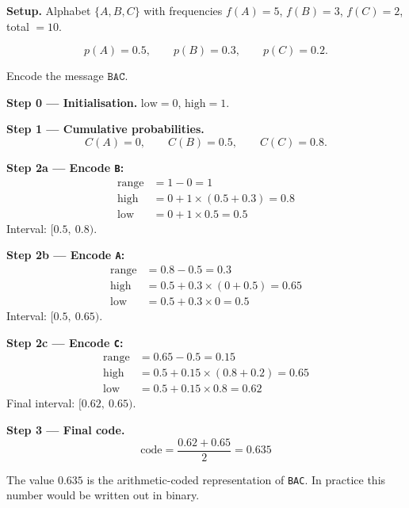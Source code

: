 \begin{examplebox}
\textbf{Setup.} Alphabet $\{A, B, C\}$ with frequencies $f(A)=5$,
$f(B)=3$, $f(C)=2$, total $= 10$.

\[
  p(A) = 0.5, \qquad p(B) = 0.3, \qquad p(C) = 0.2.
\]

Encode the message $\texttt{BAC}$.

\medskip
\textbf{Step 0 — Initialisation.}
$\mathrm{low} = 0$, $\mathrm{high} = 1$.

\medskip
\textbf{Step 1 — Cumulative probabilities.}
\[
  C(A) = 0, \qquad C(B) = 0.5, \qquad C(C) = 0.8.
\]

\medskip
\textbf{Step 2a — Encode \texttt{B}:}
\begin{align*}
  \mathrm{range} &= 1 - 0 = 1 \\
  \mathrm{high}  &= 0 + 1 \times (0.5 + 0.3) = 0.8 \\
  \mathrm{low}   &= 0 + 1 \times 0.5 = 0.5
\end{align*}
Interval: $[0.5,\ 0.8)$.

\medskip
\textbf{Step 2b — Encode \texttt{A}:}
\begin{align*}
  \mathrm{range} &= 0.8 - 0.5 = 0.3 \\
  \mathrm{high}  &= 0.5 + 0.3 \times (0 + 0.5) = 0.65 \\
  \mathrm{low}   &= 0.5 + 0.3 \times 0 = 0.5
\end{align*}
Interval: $[0.5,\ 0.65)$.

\medskip
\textbf{Step 2c — Encode \texttt{C}:}
\begin{align*}
  \mathrm{range} &= 0.65 - 0.5 = 0.15 \\
  \mathrm{high}  &= 0.5 + 0.15 \times (0.8 + 0.2) = 0.65 \\
  \mathrm{low}   &= 0.5 + 0.15 \times 0.8 = 0.62
\end{align*}
Final interval: $[0.62,\ 0.65)$.

\medskip
\textbf{Step 3 — Final code.}
\[
  \mathrm{code} = \frac{0.62 + 0.65}{2} = 0.635
\]

The value $0.635$ is the arithmetic-coded representation of \texttt{BAC}.
In practice this number would be written out in binary.
\end{examplebox}

